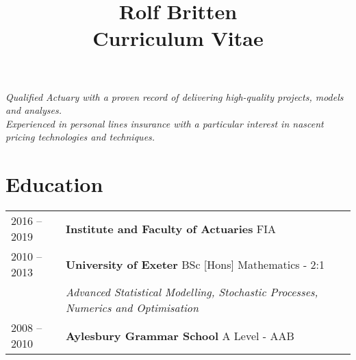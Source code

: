 \documentclass[11pt]{article}
\title{\bfseries \Huge Rolf Britten \\ \Large Curriculum Vitae}
\date{}
\begin{document}
\vspace{-40mm}
\maketitle
\vspace{-24mm}

\begin{center} \emph{Qualified Actuary with a proven record of delivering high-quality projects, models and analyses.\\Experienced in personal lines insurance with a particular interest in nascent pricing technologies and techniques.} \end{center}

\section*{Education}
\begin{tabular}{l | l l}
2016 -- 2019 & \textbf{Institute and Faculty of Actuaries} FIA \\
2010 -- 2013 & \textbf{University of Exeter} BSc [Hons] Mathematics - 2:1\\
& \hspace{4mm} \textit{Advanced Statistical Modelling, Stochastic Processes, Numerics and Optimisation }\\
2008 -- 2010 & \textbf{Aylesbury Grammar School} A Level - AAB \\
\end{tabular}
\end{document}
